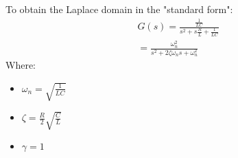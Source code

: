 To obtain the Laplace domain in the "standard form":
\begin{gather}
  G(s) = \frac{\frac{1}{LC}}{s^2 + s\frac{R}{L} + \frac{1}{LC}} \\
  = \frac{\omega_n^2}{s^2 + 2\zeta \omega_n s + \omega_n^2}
\end{gather}
Where:
\begin{itemize}
  \item $\omega_n = \sqrt{\frac{1}{LC}}$
  \item $\zeta = \frac{R}{2}\sqrt{\frac{C}{L}}$
  \item $\gamma = 1$
\end{itemize}